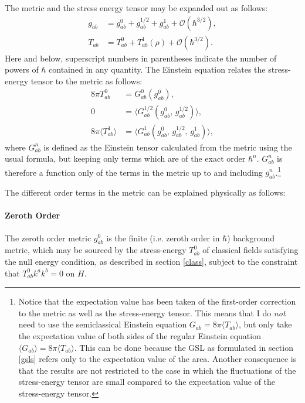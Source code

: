 \documentclass{article}
\begin{document}
The metric and the stress energy tensor may be expanded out as follows: 
\begin{align}\label{g}
g_{ab} &= g_{ab}^{0} + g_{ab}^{1/2} + g_{ab}^{1} + \mathcal{O}(\hbar^{3/2}), \\ \label{T}
T_{ab} &= T_{ab}^{0} + T_{ab}^{1}(\rho) + \mathcal{O}(\hbar^{3/2}).
\end{align}
Here and below, superscript numbers in parentheses indicate the number of powers of $\hbar$ contained in any quantity.  The Einstein equation relates the stress-energy tensor to the metric as follows:
\begin{align}\label{Ein0}
8\pi T_{ab}^{0}& = G_{ab}^{0}(g_{ab}^{0}), 
\\ \label{Ein1/2}
0& = \langle G_{ab}^{1/2} (g_{ab}^{0},\,g_{ab}^{1/2}) \rangle,
\\ \label{Ein1}
8\pi \langle T_{ab}^{1} \rangle & = \langle G_{ab}^{1} 
(g_{ab}^{0},\,g_{ab}^{1/2},\,g_{ab}^{1}) \rangle,
\end{align}
where $G_{ab}^{n}$ is defined as the Einstein tensor calculated from the metric using the usual formula, but keeping only terms which are of the exact order $\hbar^{n}$.  $G_{ab}^{n}$ is therefore a function only of the terms in the metric up to and including $g_{ab}^{n}$.\footnote{Notice that the expectation value has been taken of the first-order correction to the metric as well as the stress-energy tensor.  This means that I do \emph{not} need to use the semiclassical Einstein equation $G_{ab} = 8\pi \langle T_{ab} \rangle$, but only take the expectation value of both sides of the regular Einstein equation $\langle G_{ab} \rangle = 8\pi \langle T_{ab} \rangle$.  This can be done because the GSL as formulated in section \ref{gsls} refers only to the expectation value of the area.  Another consequence is that the results are not restricted to the case in which the fluctuations of the stress-energy tensor are small compared to the expectation value of the stress-energy tensor.}

The different order terms in the metric can be explained physically as follows:
\paragraph{Zeroth Order}
The zeroth order metric $g_{ab}^{0}$ is the finite (i.e. zeroth order in $\hbar$) background metric, which may be sourced by the stress-energy $T_{ab}^{0}$ of classical fields satisfying the null energy condition, as described in section \ref{class}, subject to the constraint that $T_{ab}^{0} k^a k^b = 0$ on $H$.
\end{document}

